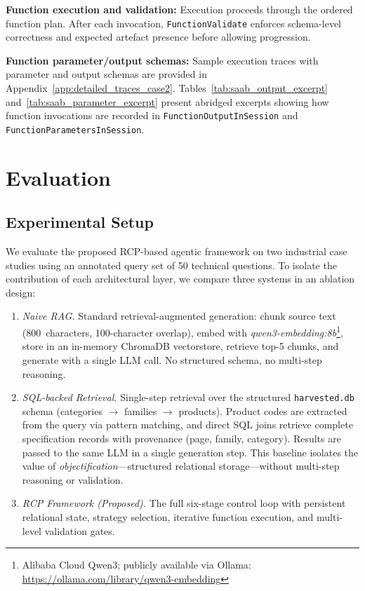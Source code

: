 \documentclass[largeformat]{interact}
\begin{document}
\noindent \textbf{Function execution and validation:}
Execution proceeds through the ordered function plan. After each invocation, \texttt{FunctionValidate} enforces schema-level correctness and expected artefact presence before allowing progression.

\noindent \textbf{Function parameter/output schemas:}
Sample execution traces with parameter and output schemas are provided in Appendix~\ref{app:detailed_traces_case2}. Tables~\ref{tab:saab_output_excerpt} and~\ref{tab:saab_parameter_excerpt} present abridged excerpts showing how function invocations are recorded in \texttt{FunctionOutputInSession} and \texttt{FunctionParametersInSession}.

\section{Evaluation}
\label{sec:evaluation}
\subsection{Experimental Setup}
\label{subsec:experimental_setup}
We evaluate the proposed RCP-based agentic framework on two industrial case studies using an annotated query set of 50 technical questions. To isolate the contribution of each architectural layer, we compare three systems in an ablation design:

\begin{enumerate}[label=\texttt{B\arabic*:}, leftmargin=3.5em]
    \item \textit{Naive RAG.} Standard retrieval-augmented generation: chunk source text (800~characters, 100-character overlap), embed with \textit{qwen3-embedding:8b}\footnote{Alibaba Cloud Qwen3; publicly available via Ollama: \url{https://ollama.com/library/qwen3-embedding}}, store in an in-memory ChromaDB vectorstore, retrieve top-5 chunks, and generate with a single LLM call. No structured schema, no multi-step reasoning.
    \item \textit{SQL-backed Retrieval.} Single-step retrieval over the structured \texttt{harvested.db} schema (categories $\rightarrow$ families $\rightarrow$ products). Product codes are extracted from the query via pattern matching, and direct SQL joins retrieve complete specification records with provenance (page, family, category). Results are passed to the same LLM in a single generation step. This baseline isolates the value of \emph{objectification}---structured relational storage---without multi-step reasoning or validation.
    \item \textit{RCP Framework (Proposed).} The full six-stage control loop with persistent relational state, strategy selection, iterative function execution, and multi-level validation gates.
\end{enumerate}
\end{document}
